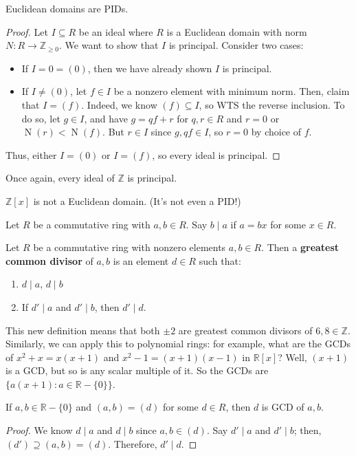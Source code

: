 \documentclass{article}
\theoremstyle{plain}
\newcommand{\R}{\mathbb{R}}
\newcommand{\Z}{\mathbb{Z}}
\newcommand{\on}[1]{\operatorname{#1}}
\begin{document}
	\begin{theorem}{}{}
	Euclidean domains are PIDs.
	\end{theorem}
	\begin{proof}
	Let $I \subseteq R$ be an ideal where $R$ is a Euclidean domain with norm $N : R \to \Z_{\ge 0}$. We want to show that $I$ is principal. Consider two cases:
	\begin{itemize}
	\item If $I = 0 = (0)$, then we have already shown $I$ is principal.
	\item If $I \ne (0)$, let $f \in I$ be a nonzero element with minimum norm. Then, claim that $I = (f)$.	Indeed, we know $(f) \subseteq I$, so WTS the reverse inclusion. To do so, let $g \in I$, and have $g = qf + r$ for $q,r \in R$ and $r = 0$ or $\on{N}(r) < \on{N}(f)$. But $r \in I$ since $g,qf \in I$, so $r = 0$ by choice of $f$.
	\end{itemize}
	Thus, either $I = (0)$ or $I = (f)$, so every ideal is principal.
	\end{proof}
	\begin{corollary}{}{}
	Once again, every ideal of $\Z$ is principal.	
	\end{corollary}
	\begin{corollary}{}{}
		$\Z[x]$ is not a Euclidean domain. (It's not even a PID!)
	\end{corollary}
	\begin{definition}{}{}
	Let $R$ be a commutative ring with $a,b\in R$. Say $b\mid a$ if $a=bx$ for some $x \in R$.	
	\end{definition}
	\begin{definition}{}{}
		Let $R$ be a commutative ring with nonzero elements $a,b\in R$. Then a \textbf{greatest common divisor} of $a,b$ is an element $d \in R$ such that:
		\begin{enumerate}[(1)]
		\item $d\mid a$, $d\mid b$
		\item If $d'\mid a$ and $d'\mid b$, then $d'\mid d$.	
		\end{enumerate}
	\end{definition}
	This new definition means that both $\pm 2$ are greatest common divisors of $6,8 \in \Z$. Similarly, we can apply this to polynomial rings: for example, what are the GCDs of $x^2 + x = x(x+1)$ and $x^2-1=(x+1)(x-1)$ in $\R[x]$? Well, $(x+1)$ is a GCD, but so is any scalar multiple of it. So the GCDs are $\{ a(x+1) : a \in \R - \{ 0 \} \}$.
	
	\begin{theorem}{}{}
	If $a,b \in \R - \{0\}$ and $(a,b) = (d)$ for some $d \in R$, then $d$ is GCD of $a, b$.
	\end{theorem}
	\begin{proof}
	We know $d\mid a$ and $d\mid b$ since $a,b \in (d)$. Say $d'\mid a$ and $d'\mid b$; then, $(d') \supseteq (a,b) = (d)$. Therefore, $d' \mid d$.	
	\end{proof}
\end{document}
